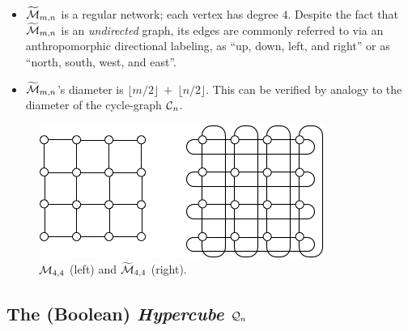 \begin{itemize}
\begin{itemize}
\item
$\widetilde{\mbox{$\cal M$}}_{m,n}$ is a regular network; each vertex has degree $4$.  Despite the fact that $\widetilde{\mbox{$\cal M$}}_{m,n}$ is an {\em undirected} graph, its edges are commonly referred to via an  anthropomorphic directional labeling, as ``up, down, left, and right''  or as ``north, south, west, and east''.
  \medskip\item
$\widetilde{\mbox{$\cal M$}}_{m,n}$'s diameter is $\lfloor m/2 \rfloor \ + \ \lfloor n/2 \rfloor$.  This can be verified by analogy to the diameter of the cycle-graph $\mbox{$\cal C$}_n$.  
\end{itemize}
\end{itemize}

\begin{figure}[hbt]
\begin{center}
       \includegraphics[scale=0.6]{FiguresGraph/meshtorus}
       \caption{$\mbox{$\cal M$}_{4,4}$ (left) and $\widetilde{\mbox{$\cal M$}}_{4,4}$ (right).}
  \label{fig:torus}
\end{center}
\end{figure}

\subsection{The (Boolean) {\it Hypercube} $\mbox{$\cal Q$}_n$}
\label{sec:hypercube}

